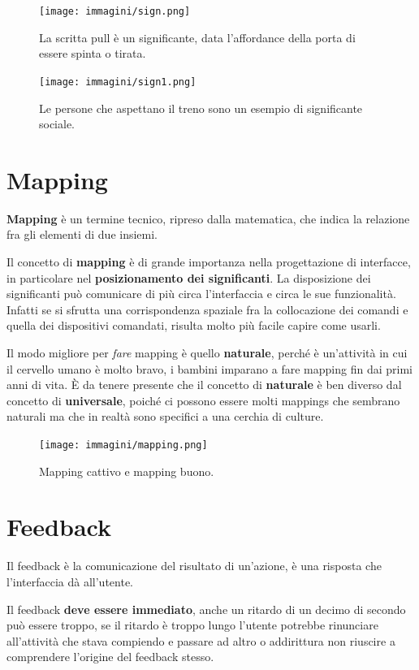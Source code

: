 \pagebreak

\begin{figure}[!h]
	\centering
	\texttt{[image: immagini/sign.png]}
	\caption{La scritta pull è un significante, data l'affordance della porta di essere spinta o tirata.}
\end{figure}
\begin{figure}[!h]
	\centering
	\texttt{[image: immagini/sign1.png]}
	\caption{Le persone che aspettano il treno sono un esempio di significante sociale.}
\end{figure}

\section{Mapping}
\textbf{Mapping} è un termine tecnico, ripreso dalla matematica, che indica la relazione fra gli elementi di due insiemi.

Il concetto di \textbf{mapping} è di grande importanza nella progettazione di interfacce, in particolare nel \textbf{posizionamento dei significanti}. La disposizione dei significanti può comunicare di più circa l'interfaccia e circa le sue funzionalità. Infatti se si sfrutta una corrispondenza spaziale fra la collocazione dei comandi e quella dei dispositivi comandati, risulta molto più facile capire come usarli.

Il modo migliore per \textit{fare} mapping è quello \textbf{naturale}, perché è un'attività in cui il cervello umano è molto bravo, i bambini imparano a fare mapping fin dai primi anni di vita. È da tenere presente che il concetto di \textbf{naturale} è ben diverso dal concetto di \textbf{universale}, poiché ci possono essere molti mappings che sembrano naturali ma che in realtà sono specifici a una cerchia di culture.

\begin{figure}[!h]
	\centering
	\texttt{[image: immagini/mapping.png]}
	\caption{Mapping cattivo e mapping buono.}
\end{figure}

\pagebreak

\section{Feedback}
Il feedback è la comunicazione del risultato di un'azione, è una risposta che l'interfaccia dà all'utente.

Il feedback \textbf{deve essere immediato}, anche un ritardo di un decimo di secondo può essere troppo, se il ritardo è troppo lungo l'utente potrebbe rinunciare all'attività che stava compiendo e passare ad altro o addirittura non riuscire a comprendere l'origine del feedback stesso.

